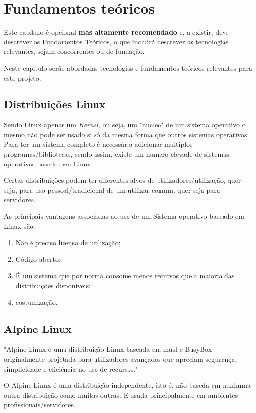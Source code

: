 \chapter{Fundamentos teóricos}
\label{chap:theo}

Este capítulo é opcional \textbf{mas altamente recomendado} e, a existir, deve descrever os Fundamentos Teóricos, o que incluirá descrever as tecnologias relevantes, sejam concorrentes ou de fundação.

Neste capitulo serão abordadas tecnologias e fundamentos teóricos relevantes para 
este projeto. \\

\section{Distribuições Linux}

Sendo Linux apenas um \textit{Kernel}, ou seja, um "nucleo" de um sistema operativo
o mesmo não pode ser usado si só da mesma forma que outros sistemas operativos.
Para ter um sistema completo é necessário adicionar multiplos programas/bibliotecas,
sendo assim, existe um numero elevado de sistemas operativos basedos em Linux.

Certas distribuições podem ter diferentes alvos de utilizadores/utilização, quer seja,
para uso pessoal/tradicional de um utilizar comum, quer seja para servidores.

As principais vantagens associadas ao uso de um Sistema operativo baseado em Linux são:
\begin{enumerate}
    \item Não é preciso licensa de utilização;
    \item Código aberto;
    \item É um sistema que por norma consome menos recursos que a maioria das distribuições disponiveis;
    \item costumização.
\end{enumerate} 



\section{Alpine Linux}

"Alpine Linux é uma distribuição Linux baseada em musl e BusyBox originalmente
projetada para utilizadores avançados que apreciam segurança, simplicidade e eficiência 
no uso de recursos." \cite{alpinewiki}

O Alpine Linux é uma distribuição independente, isto é, não baseda em nunhuma 
outra distribuição como muitas outras. E usada principalmente em ambientes
profissionais/servidores.

